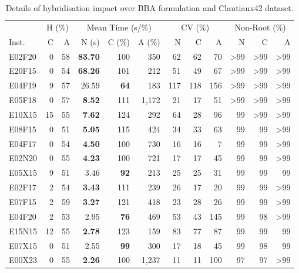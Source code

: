 \documentclass[ppgc,tese,english,formais,babel]{iiufrgs}
\newcommand{\bestcolumnemph}[1]{\textbf{#1}}
\begin{document}
\begin{table}[!ht]
\caption{Details of hybridisation impact over BBA formulation and Clautiaux42 dataset.}
\label{tab:g2opp_multiple_seeds_full_CV_hyb}
\begin{center}
\begin{tabular}{lrrrrrrrrrrr}
\hline\hline
& \multicolumn{2}{c}{H (\%)} & \multicolumn{3}{c}{Mean Time (s/\%)} & \multicolumn{3}{c}{CV (\%)} & \multicolumn{3}{c}{Non-Root (\%)} \\\cmidrule(lr){2-3}\cmidrule(lr){4-6}\cmidrule(lr){7-9}\cmidrule(lr){10-12}
Inst. & C & A & N (s) & C (\%) & A (\%) & N & C & A & N & C & A \\\hline\hline
E02F20 & 0 & 58 & \bestcolumnemph{83.70} & 100 & 350 & 62 & 62 & 70 & >99 & >99 & >99 \\
E20F15 & 0 & 54 & \bestcolumnemph{68.26} & 101 & 212 & 51 & 49 & 67 & >99 & >99 & >99 \\
E04F19 & 9 & 57 & 26.59 & \bestcolumnemph{64} & 183 & 117 & 118 & 156 & >99 & >99 & >99 \\
E05F18 & 0 & 57 & \bestcolumnemph{8.52} & 111 & 1,172 & 21 & 17 & 51 & >99 & >99 & >99 \\
E10X15 & 15 & 55 & \bestcolumnemph{7.62} & 124 & 292 & 64 & 28 & 96 & 99 & >99 & >99 \\
E08F15 & 0 & 51 & \bestcolumnemph{5.05} & 115 & 424 & 34 & 33 & 63 & 99 & 99 & >99 \\
E04F17 & 0 & 54 & \bestcolumnemph{4.50} & 100 & 730 & 16 & 16 & 7 & 99 & 99 & >99 \\
E02N20 & 0 & 55 & \bestcolumnemph{4.23} & 100 & 721 & 17 & 17 & 45 & 99 & 99 & >99 \\
E05X15 & 9 & 51 & 3.46 & \bestcolumnemph{92} & 213 & 25 & 25 & 31 & 99 & 99 & 99 \\
E02F17 & 2 & 54 & \bestcolumnemph{3.43} & 111 & 239 & 26 & 17 & 20 & 99 & 99 & >99 \\
E07F15 & 2 & 59 & \bestcolumnemph{3.27} & 121 & 418 & 23 & 28 & 26 & 99 & 99 & >99 \\
E04F20 & 2 & 53 & 2.95 & \bestcolumnemph{76} & 469 & 53 & 43 & 145 & 99 & 98 & >99 \\
E15N15 & 12 & 55 & \bestcolumnemph{2.78} & 123 & 159 & 83 & 77 & 87 & 99 & 99 & 99 \\
E07X15 & 0 & 51 & 2.55 & \bestcolumnemph{99} & 300 & 17 & 18 & 45 & 99 & 98 & 99 \\
E00X23 & 0 & 55 & \bestcolumnemph{2.26} & 100 & 1,237 & 11 & 11 & 100 & 97 & 97 & >99 \\

\end{tabular}
\end{center}
\end{table}
\end{document}
